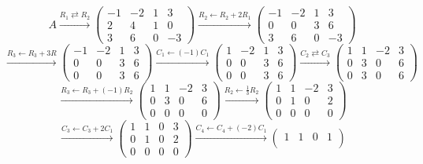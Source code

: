 \documentclass[12pt]{article}
\begin{document}
{	\[
		A \overset{R_1 \rightleftarrows R_2}{\longrightarrow}
		\begin{pmatrix}
			-1 & -2 & 1 & 3\\
			2 & 4 & 1 & 0\\
			3 & 6 & 0 & -3
		\end{pmatrix}
		\overset{R_2 \leftarrow R_2+2R_1} {\longrightarrow}
		\begin{pmatrix}
			-1 & -2 & 1 & 3\\
			0 & 0 & 3 & 6\\
			3 & 6 & 0 & -3
		\end{pmatrix}
	\]
	\[
		\overset{R_3 \leftarrow R_3 + 3R}{\longrightarrow}
		\begin{pmatrix}
			-1 & -2 & 1 & 3\\
			0 & 0 & 3 & 6 \\
			0 & 0 & 3 & 6 
		\end{pmatrix}
		\overset{C_1 \leftarrow (-1)C_1}{\longrightarrow}
		\begin{pmatrix}
			1 & -2 & 1 & 3\\
			0 & 0 & 3 & 6\\
			0 & 0 & 3 & 6
		\end{pmatrix}
		\overset{C_2 \rightleftarrows C_3}{\longrightarrow}
		\begin{pmatrix}
			1 & 1 & -2 & 3\\
			0 & 3 & 0 & 6\\
			0 & 3 & 0 & 6
		\end{pmatrix}
	\]
	\[
		\overset{R_3 \leftarrow R_3 + (-1)R_2}{\longrightarrow}
		\begin{pmatrix}
			1 & 1 & -2 & 3\\
			0 & 3 & 0 & 6 \\
			0 & 0 & 0 & 0
		\end{pmatrix}
		\overset{R_2 \leftarrow \frac 13 R_2}{\longrightarrow}
		\begin{pmatrix}
			1 & 1 & -2 & 3\\
			0 & 1 & 0 & 2\\
			0 & 0 & 0 & 0
		\end{pmatrix}
	\]
	\[
		\overset{C_3 \leftarrow C_3 + 2C_1}{\longrightarrow}
		\begin{pmatrix}
			1 & 1 & 0 & 3\\
			0 & 1 & 0 & 2\\
			0 & 0 & 0 & 0
		\end{pmatrix}
		\overset{C_4 \leftarrow C_4 + (-2)C_1}{\longrightarrow}
		\begin{pmatrix}
			1 & 1 & 0 & 1\\

\end{pmatrix}\]}
\end{document}

